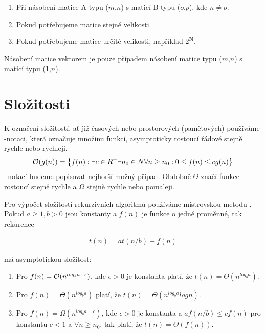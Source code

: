 \begin{enumerate}
  \item Při násobení matice A typu ($m$,$n$) s maticí B typu ($o$,$p$), kde $ n \neq o $.
  \item Pokud potřebujeme matice stejné velikosti.
  \item Pokud potřebujeme matice určité velikosti, například $ 2^{ \mathbf{N}} $.
\end{enumerate}

Násobení matice vektorem je pouze případem násobení matice typu ($m$,$n$) s maticí typu ($1$,$n$).

\section{Složitosti}

K označení složitostí, ať již časových nebo prostorových (paměťových) používáme \bigO-notaci, která označuje množinu funkcí, asymptoticky rostoucí řádově stejně rychle nebo rychleji.
\begin{align}
\mathcal{O}(g(n)) = \left\{ f(n) : \exists c \in R^+ \exists n_0 \in N \forall n \geq n_0 : 0 \leq f(n) \leq cg(n) \right\}
\end{align}
\bigO\texttt{ }notací budeme popisovat nejhorší možný případ. Obdobně $\Theta$ značí funkce rostoucí stejně rychle a $\Omega$ stejně rychle nebo pomaleji.


Pro výpočet složitostí rekurzivních algoritmů používáme mistrovskou metodu \cite{Cormen:2001:IA:580470}. Pokud $a \geq 1, b > 0$ jsou konstanty a $f(n)$ je funkce o jedné proměnné, tak rekurence

\begin{align}
t(n) = at(n/b)+f(n)
\end{align}

má asymptotickou složitost:

\begin{enumerate}
  \item Pro $f(n) = \mathcal{O}(n^{log_b{a - \epsilon}})$, kde $\epsilon > 0$ je konstanta platí, že $t(n)=\Theta(n^{log_b{a}})$.
  \item Pro $f(n) = \Theta(n^{log_b{a}})$ platí, že $t(n)=\Theta(n^{log_b{a}}log{n})$.
  \item Pro $f(n) = \Omega(n^{log_b{a + \epsilon}})$, kde $\epsilon > 0$ je konstanta a $af(n/b) \leq cf(n)$ pro konstantu $c < 1$ a $\forall n\geq n_0$, tak platí, že $t(n)=\Theta(f(n))$.
\end{enumerate}

